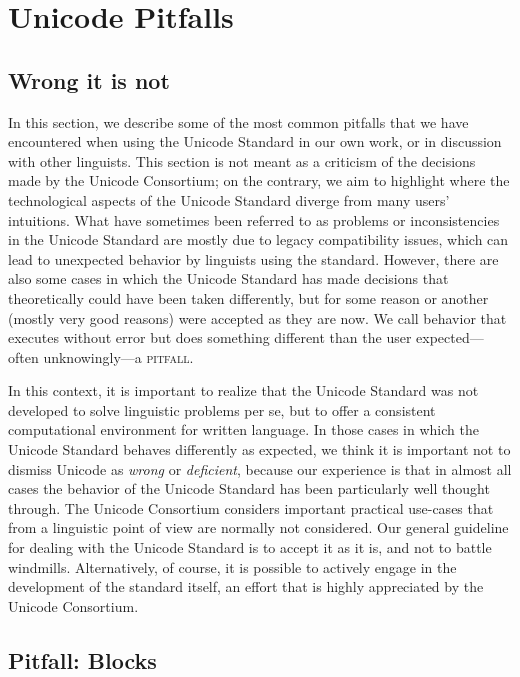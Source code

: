 \chapter{Unicode Pitfalls} \label{unicode-pitfalls}

\section{Wrong it is not} \label{wrong-it-is-not}

In this section, we describe some of the most common pitfalls that we have
encountered when using the Unicode Standard in our own work, or in discussion
with other linguists. This section is not meant as a criticism of the decisions
made by the Unicode Consortium; on the contrary, we aim to highlight where the
technological aspects of the Unicode Standard diverge from many users'
intuitions. What have sometimes been referred to as problems or inconsistencies
in the Unicode Standard are mostly due to legacy compatibility issues, which can
lead to unexpected behavior by linguists using the standard. However, there are
also some cases in which the Unicode Standard has made decisions that
theoretically could have been taken differently, but for some reason or another
(mostly very good reasons) were accepted as they are now. We call behavior that
executes without error but does something different than the user
expected---often unknowingly---a \textsc{pitfall}.

In this context, it is important to realize that the Unicode Standard was not
developed to solve linguistic problems per se, but to offer a consistent
computational environment for written language. In those cases in which the
Unicode Standard behaves differently as expected, we think it is important not
to dismiss Unicode as \textit{wrong} or \textit{deficient}, because our
experience is that in almost all cases the behavior of the Unicode Standard has
been particularly well thought through. The Unicode Consortium considers
important practical use-cases that from a linguistic point of view are normally
not considered. Our general guideline for dealing with the Unicode Standard is
to accept it as it is, and not to battle windmills. Alternatively, of course, it
is possible to actively engage in the development of the standard itself, an
effort that is highly appreciated by the Unicode Consortium.

\section{Pitfall: Blocks} \label{pitfall-blocks}

